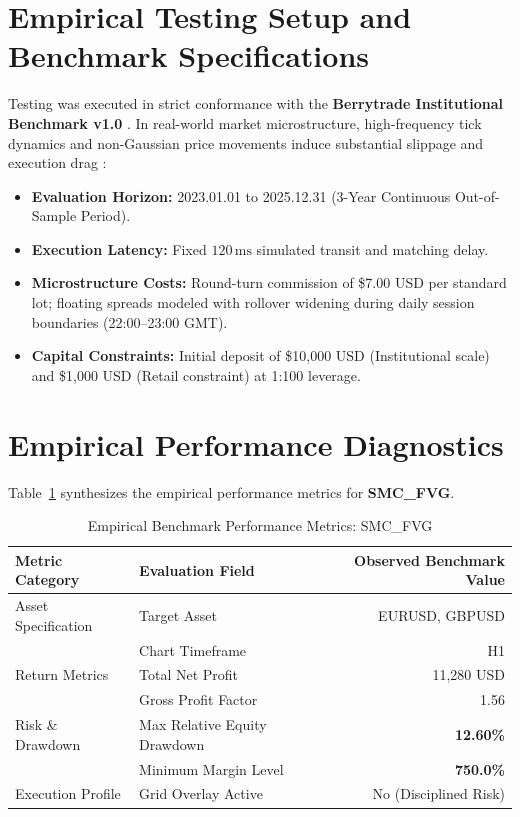\documentclass[11pt,a4paper]{article}
\begin{document}
\section{Empirical Testing Setup and Benchmark Specifications}
Testing was executed in strict conformance with the \textbf{Berrytrade Institutional Benchmark v1.0} \cite{artsu2026illusion}. In real-world market microstructure, high-frequency tick dynamics and non-Gaussian price movements induce substantial slippage and execution drag \cite{kyle1985continuous, amihud2002illiquidity, cont2001empirical, mandelbrot1963variation}:
\begin{itemize}
    \item \textbf{Evaluation Horizon:} 2023.01.01 to 2025.12.31 (3-Year Continuous Out-of-Sample Period).
    \item \textbf{Execution Latency:} Fixed $120\,\text{ms}$ simulated transit and matching delay.
    \item \textbf{Microstructure Costs:} Round-turn commission of \$7.00 USD per standard lot; floating spreads modeled with rollover widening during daily session boundaries (22:00--23:00 GMT).
    \item \textbf{Capital Constraints:} Initial deposit of \$10,000 USD (Institutional scale) and \$1,000 USD (Retail constraint) at 1:100 leverage.
\end{itemize}

\section{Empirical Performance Diagnostics}
Table~\ref{tab:metrics} synthesizes the empirical performance metrics for \textbf{SMC\_FVG}.

\begin{table}[H]
\centering
\caption{Empirical Benchmark Performance Metrics: SMC\_FVG}
\label{tab:metrics}
\begin{tabular}{llr}
\toprule
\textbf{Metric Category} & \textbf{Evaluation Field} & \textbf{Observed Benchmark Value} \\
\midrule
Asset Specification & Target Asset & EURUSD, GBPUSD \\
& Chart Timeframe & H1 \\
Return Metrics & Total Net Profit & 11,280 USD \\
& Gross Profit Factor & 1.56 \\
Risk \& Drawdown & Max Relative Equity Drawdown & \textbf{12.60\%} \\
& Minimum Margin Level & \textbf{750.0\%} \\
Execution Profile & Grid Overlay Active & No (Disciplined Risk) \\
\bottomrule
\end{tabular}
\end{table}
\end{document}
